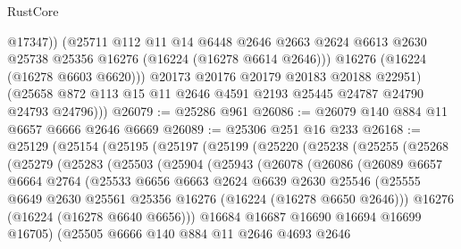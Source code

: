 \begin{lexlean}{RustCore}
\begin{coremodule}
                @17347))
            (@25711
              @112
              @11
              @14
              @6448
              @2646
              @2663
              @2624
              @6613
              @2630
              @25738
              @25356
              @16276
              (@16224 (@16278 @6614 @2646)))
            @16276
            (@16224 (@16278 @6603 @6620)))
          @20173
          @20176
          @20179
          @20183
          @20188
          @22951)
        (@25658 @872 @113 @15 @11 @2646 @4591 @2193 @25445 @24787 @24790 @24793 @24796)))
@26079 := @25286 @961
@26086 := @26079 @140 @884 @11 @6657 @6666 @2646 @6669
@26089 := @25306 @251 @16 @233
@26168 := @25129
    (@25154
      (@25195
        (@25197
          (@25199
            (@25220
              (@25238
                (@25255
                  (@25268
                    (@25279
                      (@25283
                        (@25503
                          (@25904
                            (@25943
                              (@26078
                                (@26086
                                  (@26089
                                    @6657
                                    @6664
                                    @2764
                                    (@25533
                                      @6656
                                      @6663
                                      @2624
                                      @6639
                                      @2630
                                      @25546
                                      (@25555
                                        @6649
                                        @2630
                                        @25561
                                        @25356
                                        @16276
                                        (@16224 (@16278 @6650 @2646)))
                                      @16276
                                      (@16224 (@16278 @6640 @6656)))
                                    @16684
                                    @16687
                                    @16690
                                    @16694
                                    @16699
                                    @16705)
                                  (@25505
                                    @6666
                                    @140
                                    @884
                                    @11
                                    @2646
                                    @4693
                                    @2646

\end{coremodule}
\end{lexlean}
